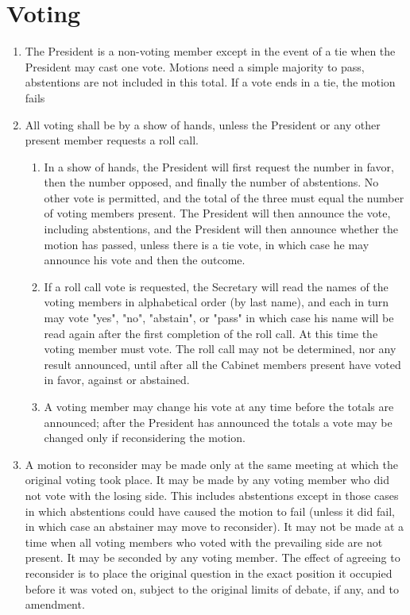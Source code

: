 \section{Voting}
\label{voting}
\begin{enumerate}
\item The President is a non-voting member except in the event of a tie when the President may
cast one vote. Motions need a simple majority to pass, abstentions are not included in this
total. If a vote ends in a tie, the motion fails
\item All voting shall be by a show of hands, unless the President or any other present member
requests a roll call. 
    \begin{enumerate}
    \item In a show of hands, the President will first request the number in favor, then the
number opposed, and finally the number of abstentions. No other vote is permitted,
and the total of the three must equal the number of voting members present. The
President will then announce the vote, including abstentions, and the President will
then announce whether the motion has passed, unless there is a tie vote, in which case
he may announce his vote and then the outcome. 
    \item If a roll call vote is requested, the Secretary will read the names of the voting
members in alphabetical order (by last name), and each in turn may vote "yes", "no",
"abstain", or "pass" in which case his name will be read again after the first
completion of the roll call. At this time the voting member must vote. The roll call
may not be determined, nor any result announced, until after all the Cabinet members
present have voted in favor, against or abstained. 
    \item A voting member may change his vote at any time before the totals are announced;
after the President has announced the totals a vote may be changed only if
reconsidering the motion. 
    \end{enumerate}
\item A motion to reconsider may be made only at the same meeting at which the original voting
took place. It may be made by any voting member who did not vote with the losing side. This
includes abstentions except in those cases in which abstentions could have caused the motion
to fail (unless it did fail, in which case an abstainer may move to reconsider). It may not be
made at a time when all voting members who voted with the prevailing side are not present. It
may be seconded by any voting member. The effect of agreeing to reconsider is to place the
original question in the exact position it occupied before it was voted on, subject to the
original limits of debate, if any, and to amendment.
\end{enumerate}
